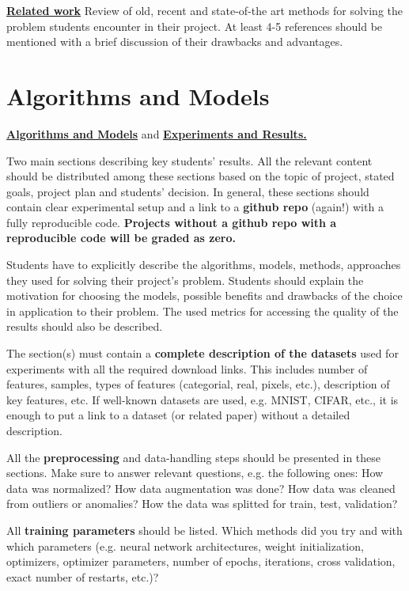 \documentclass{article}
\begin{document}
\underline{\textbf{Related work}} Review of old, recent and state-of-the art methods for solving the problem students encounter in their project. At least 4-5 references should be mentioned with a brief discussion of their drawbacks and advantages.

\section{Algorithms and Models}\label{algorithms_and_models}

\underline{\textbf{Algorithms and Models}} and \underline{\textbf{Experiments and Results.}}

Two main sections describing key students' results. All the relevant content should be distributed among these sections based on the topic of project, stated goals, project plan and students' decision. In general, these sections should contain clear experimental setup and a  link to a \textbf{github repo} (again!) with a fully reproducible code. \textbf{Projects without a github repo with a reproducible code will be graded as zero.}

Students have to explicitly describe the algorithms, models, methods, approaches they used for solving their project's problem. Students should explain the motivation for choosing the models, possible benefits and drawbacks of the choice in application to their problem. The used metrics for accessing the quality of the results should also be described.

The section(s) must contain a \textbf{complete description of the datasets} used for experiments with all the required download links. This includes number of features, samples, types of features (categorial, real, pixels, etc.), description of key features, etc. If well-known datasets are used, e.g. MNIST, CIFAR, etc., it is enough to put a link to a dataset (or related paper) without a detailed description.

All the \textbf{preprocessing} and data-handling steps should be presented in these sections. Make sure to answer relevant questions, e.g. the following ones: How data was normalized? How data augmentation was done? How data was cleaned from outliers or anomalies? How the data was splitted for train, test, validation?

All \textbf{training parameters} should be listed. Which methods did you try and with which parameters (e.g. neural network architectures, weight initialization, optimizers, optimizer parameters, number of epochs, iterations, cross validation, exact number of restarts, etc.)?
\end{document}
